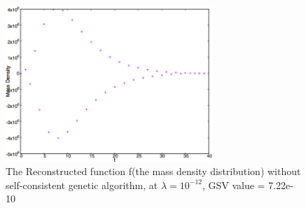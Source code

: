 \documentclass{article}
\begin{document}
\begin{figure}[h!]
  \centering
    \includegraphics[width=0.7\textwidth]{images/reconstructedmassdensitybad}
  \caption{The Reconstructed function f(the mass density distribution) without
  self-consistent genetic algorithm, at \(\lambda  = {10^{ - 12}}\), GSV value
  = 7.22e-10}
  \label{fig:RMASSBAD}
\end{figure}

{}

\end{document}
